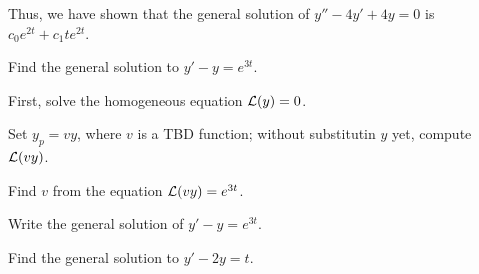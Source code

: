 \begin{applicationActivities}
\begin{observation}
Thus, we have shown that the general solution of \(y''-4y'+4y=0\) is \(c_0e^{2t}+c_1te^{2t}\).
\end{observation}

\begin{activity}{15}
Find the general solution to \(y'-y=e^{3t}\).
\vfill
\begin{subactivity}
First, solve the homogeneous equation \(\mathcal{L}(y)=0\).
\end{subactivity}
\begin{subactivity}
Set \(y_p=vy\), where  \(v\) is a TBD function; without substitutin \(y\) yet, compute \(\mathcal{L}(vy) \).
\end{subactivity}
\begin{subactivity}
Find \(v\) from the equation \(\mathcal{L}(vy)=e^{3t}\).
\end{subactivity}
\begin{subactivity}
Write the general solution of \(y'-y=e^{3t}\).
\end{subactivity}
\end{activity}

\begin{activity}{10}
Find the general solution to \(y'-2y=t\).
\end{activity}


\end{applicationActivities}
